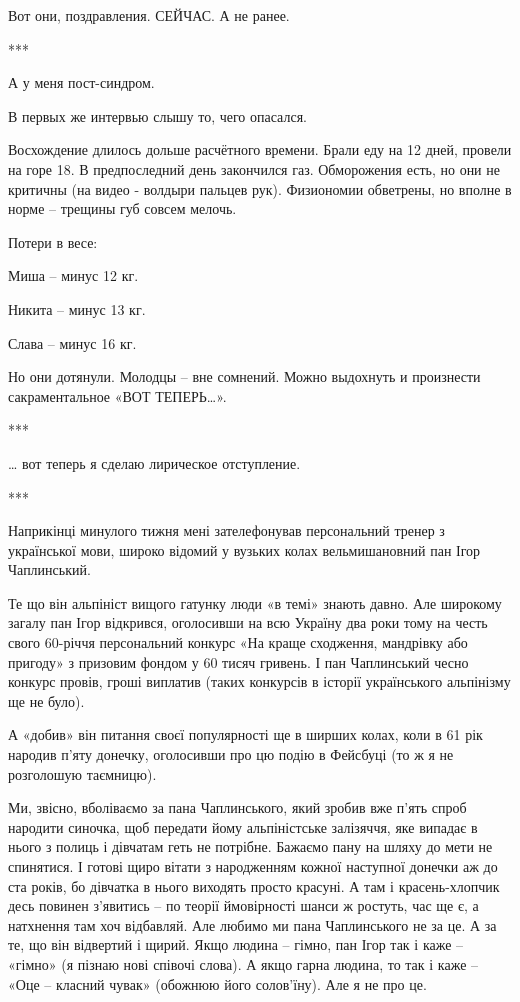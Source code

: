 Вот они, поздравления. СЕЙЧАС. А не ранее.

***

А у меня пост-синдром.

В первых же интервью слышу то, чего опасался.

Восхождение длилось дольше расчётного времени. Брали еду на 12 дней, провели на
горе 18. В предпоследний день закончился газ. Обморожения есть, но они не
критичны (на видео - волдыри пальцев рук). Физиономии обветрены, но вполне в
норме – трещины губ совсем мелочь.

Потери в весе:

Миша – минус 12 кг.

Никита – минус 13 кг.

Слава – минус 16 кг.

Но они дотянули. Молодцы – вне сомнений. Можно выдохнуть и произнести
сакраментальное «ВОТ ТЕПЕРЬ…».

***

… вот теперь я сделаю лирическое отступление.

***

Наприкінці минулого тижня мені зателефонував персональний тренер з української
мови, широко відомий у вузьких колах вельмишановний пан Ігор Чаплинський.

Те що він альпініст вищого гатунку люди «в темі» знають давно. Але широкому
загалу пан Ігор відкрився, оголосивши на всю Україну два роки тому на честь
свого 60-річчя персональний конкурс «На краще сходження, мандрівку або пригоду»
з призовим фондом у 60 тисяч гривень. І пан Чаплинський чесно конкурс провів,
гроші виплатив (таких конкурсів в історії українського альпінізму ще не було).

А «добив» він питання своєї популярності ще в ширших колах, коли в 61 рік
народив п’яту донечку, оголосивши про цю подію в Фейсбуці (то ж я не розголошую
таємницю).

Ми, звісно, вболіваємо за пана Чаплинського, який зробив вже п’ять спроб
народити синочка, щоб передати йому альпіністське залізяччя, яке випадає в
нього з полиць і дівчатам геть не потрібне. Бажаємо пану на шляху до мети не
спинятися. І готові щиро вітати з народженням кожної наступної донечки аж до
ста років, бо дівчатка в нього виходять просто красуні. А там і красень-хлопчик
десь повинен з’явитись – по теорії ймовірності шанси ж ростуть, час ще є, а
натхнення там хоч відбавляй. Але любимо ми пана Чаплинського не за це. А за те,
що він відвертий і щирий. Якщо людина – гімно, пан Ігор так і каже – «гімно» (я
пізнаю нові співочі слова). А якщо гарна людина, то так і каже – «Оце – класний
чувак» (обожнюю його солов’їну). Але я не про це.

